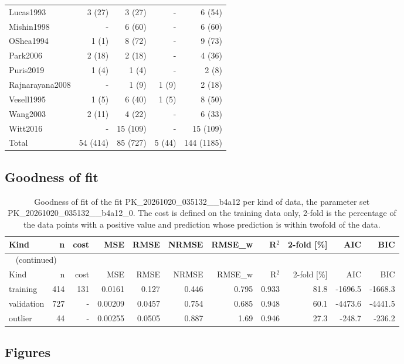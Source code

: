 \documentclass{article}
\begin{document}
\begin{longtable}{lrrrr}
Lucas1993 & 3 (27) & 3 (27) & - & 6 (54) \\
Mishin1998 & - & 6 (60) & - & 6 (60) \\
OShea1994 & 1 (1) & 8 (72) & - & 9 (73) \\
Park2006 & 2 (18) & 2 (18) & - & 4 (36) \\
Puris2019 & 1 (4) & 1 (4) & - & 2 (8) \\
Rajnarayana2008 & - & 1 (9) & 1 (9) & 2 (18) \\
Vesell1995 & 1 (5) & 6 (40) & 1 (5) & 8 (50) \\
Wang2003 & 2 (11) & 4 (22) & - & 6 (33) \\
Witt2016 & - & 15 (109) & - & 15 (109) \\
Total & 54 (414) & 85 (727) & 5 (44) & 144 (1185) \\
\end{longtable}

\subsection{Goodness of fit}

\begin{longtable}{lrrrrrrrrrr}
\caption{Goodness of fit of the fit PK\_20261020\_035132\_\_b4a12 per kind of data, the parameter set PK\_20261020\_035132\_\_b4a12\_0. The cost is defined on the training data only, 2-fold is the percentage of the data points with a positive value and prediction whose prediction is within twofold of the data.}\label{tab:metrics:PK_20261020_035132__b4a12} \\
\toprule
Kind & n & cost & MSE & RMSE & NRMSE & RMSE\_w & R\ensuremath{^{2}} & 2-fold [\%] & AIC & BIC \\
\midrule
\endfirsthead
\multicolumn{11}{l}{\small\tablename~\thetable{} (continued)} \\
\toprule
Kind & n & cost & MSE & RMSE & NRMSE & RMSE\_w & R\ensuremath{^{2}} & 2-fold [\%] & AIC & BIC \\
\midrule
\endhead
\bottomrule
\endlastfoot
training & 414 & 131 & 0.0161 & 0.127 & 0.446 & 0.795 & 0.933 & 81.8 & -1696.5 & -1668.3 \\
validation & 727 & - & 0.00209 & 0.0457 & 0.754 & 0.685 & 0.948 & 60.1 & -4473.6 & -4441.5 \\
outlier & 44 & - & 0.00255 & 0.0505 & 0.887 & 1.69 & 0.946 & 27.3 & -248.7 & -236.2 \\
\end{longtable}

\subsection{Figures}
\end{document}
